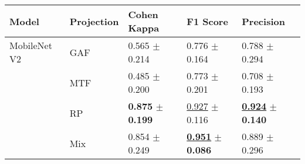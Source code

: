
\begin{tabular}{lllll}
\toprule
Model & Projection & Cohen Kappa & F1 Score & Precision \\
\midrule
MobileNet V2 & GAF & \textcolor[rgb]{0.7938511327,0.2061488673,0}{0.565} $\pm$ \textcolor[rgb]{0.2952684545,0.5000000000,0}{0.214} & \textcolor[rgb]{0.9821283509,0.0178716491,0}{0.776} $\pm$ \textcolor[rgb]{0.6787537060,0.3212462940,0}{0.164} & \textcolor[rgb]{0.6304985337,0.3695014663,0}{0.788} $\pm$ \textcolor[rgb]{0.9899538679,0.0100461321,0}{0.294} \\
 & MTF & \textcolor[rgb]{1.0000000000,0.0000000000,0}{0.485} $\pm$ \textcolor[rgb]{0.0127390111,0.5000000000,0}{0.200} & \textcolor[rgb]{1.0000000000,0.0000000000,0}{0.773} $\pm$ \textcolor[rgb]{1.0000000000,0.0000000000,0}{0.201} & \textcolor[rgb]{1.0000000000,0.0000000000,0}{0.708} $\pm$ \textcolor[rgb]{0.3412279401,0.5000000000,0}{0.193} \\
 & RP & \textbf{\textcolor[rgb]{0.0000000000,0.5000000000,0}{0.875}} $\pm$ \textbf{\textcolor[rgb]{0.0000000000,0.5000000000,0}{0.199}} & \underline{\textcolor[rgb]{0.1332250203,0.5000000000,0}{0.927}} $\pm$ \textcolor[rgb]{0.2595217982,0.5000000000,0}{0.116} & \underline{\textbf{\textcolor[rgb]{0.0000000000,0.5000000000,0}{0.924}}} $\pm$ \textbf{\textcolor[rgb]{0.0000000000,0.5000000000,0}{0.140}} \\
 & Mix & \textcolor[rgb]{0.0533980583,0.5000000000,0}{0.854} $\pm$ \textcolor[rgb]{1.0000000000,0.0000000000,0}{0.249} & \underline{\textbf{\textcolor[rgb]{0.0000000000,0.5000000000,0}{0.951}}} $\pm$ \textbf{\textcolor[rgb]{0.0000000000,0.5000000000,0}{0.086}} & \textcolor[rgb]{0.1612903226,0.5000000000,0}{0.889} $\pm$ \textcolor[rgb]{1.0000000000,0.0000000000,0}{0.296} \\
\bottomrule
\end{tabular}

